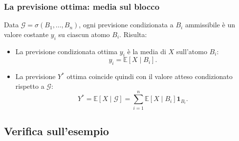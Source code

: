 \documentclass[handout]{beamer}%
\newenvironment{stepitemize}{\begin{itemize}[<+->]}{\end{itemize} }
\providecommand{\E}{\mathbb{E}}
\providecommand{\G}{\mathcal{G}}
\providecommand{\1}{\mathbf{1}}
\providecommand{\QTR}[2]{\csname #1\endcsname{#2}}
\begin{document}
\begin{frame}%
%

\frametitle{La previsione ottima: media sul blocco}%
%

%


Data $\G = \sigma(B_{1},\ldots,B_{n})$, ogni previsione condizionata a $B_{i}$
ammissibile \`{e} un valore costante $y_{i}$ su ciascun atomo $B_{i}$. Risulta:

\begin{stepitemize}
\item La previsione condizionata ottima $y_{i}$ \`{e} la media di $X$
sull'atomo $B_{i}$:
\[
y_{i} = \E[X \mid B_i].
\]


\item La previsione $Y^{*}$ ottima coincide quindi con il valore atteso
condizionato rispetto a $\G$:
\[
Y^{*} = \E[X \mid \G] = \sum_{i=1}^{n} \E[X \mid B_i] \1_{B_{i}}.
\]

\end{stepitemize}%

\transboxout
\end{frame}%


\subsection{Verifica sull'esempio}%
\end{document}
